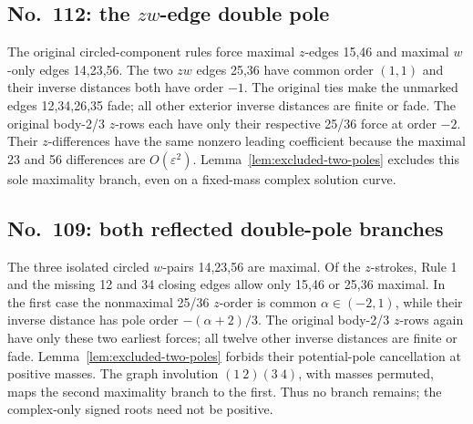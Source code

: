 \documentclass[11pt]{amsart}
\theoremstyle{remark}
\begin{document}
\subsection{No.~112: the $zw$-edge double pole}\label{sec:no112-poles}
The original circled-component rules force maximal $z$-edges 15,46 and maximal $w$-only edges 14,23,56. The two $zw$ edges 25,36 have common order $(1,1)$ and their inverse distances both have order $-1$. The original ties make the unmarked edges 12,34,26,35 fade; all other exterior inverse distances are finite or fade. The original body-2/3 $z$-rows each have only their respective 25/36 force at order $-2$. Their $z$-differences have the same nonzero leading coefficient because the maximal 23 and 56 differences are $O(\varepsilon^2)$. Lemma~\ref{lem:excluded-two-poles} excludes this sole maximality branch, even on a fixed-mass complex solution curve.
\subsection{No.~109: both reflected double-pole branches}\label{sec:no109-poles}
The three isolated circled $w$-pairs 14,23,56 are maximal. Of the $z$-strokes, Rule 1 and the missing 12 and 34 closing edges allow only 15,46 or 25,36 maximal. In the first case the nonmaximal 25/36 $z$-order is common $\alpha\in(-2,1)$, while their inverse distance has pole order $-(\alpha+2)/3$. The original body-2/3 $z$-rows again have only these two earliest forces; all twelve other inverse distances are finite or fade. Lemma~\ref{lem:excluded-two-poles} forbids their potential-pole cancellation at positive masses. The graph involution $(1\ 2)(3\ 4)$, with masses permuted, maps the second maximality branch to the first. Thus no branch remains; the complex-only signed roots need not be positive.
\end{document}
